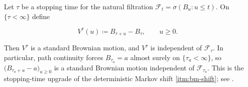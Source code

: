 \documentclass[11pt,a4paper]{article}
\begin{document}
\begin{theorem}
\label{thm:bm-strong-markov}
Let \(\tau\) be a stopping time for the natural filtration \(\mathcal{F}_{t}=\sigma(B_{u}:u\le t)\). On \(\{\tau<\infty\}\) define

\[
V^{\tau}(u)
\coloneqq
B_{\tau+u}-B_{\tau},
\qquad
u\ge 0.
\]

Then \(V^{\tau}\) is a standard Brownian motion, and \(V^{\tau}\) is independent of \(\mathcal{F}_{\tau}\). In particular, path continuity forces \(B_{\tau_{a}}=a\) almost surely on \(\{\tau_{a}<\infty\}\), so \(\bigl(B_{\tau_{a}+u}-a\bigr)_{u\ge 0}\) is a standard Brownian motion independent of \(\mathcal{F}_{\tau_{a}}\). This is the stopping-time upgrade of the deterministic Markov shift \cref{itm:bm-shift}; see \citep[Chapter~8]{durrett2010}.
\end{theorem}
\end{document}
